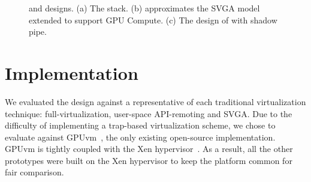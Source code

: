 \begin{figure}[!th]
\begin{subfigure}{.68\columnwidth}
		\caption{{}}
		\label{fig_trillium_direct}
	\end{subfigure}
	\caption{{\footnotesize \trxc and \Trillium designs. (a) The \Trillium stack. (b) \trxc approximates the SVGA model extended to support GPU Compute. (c) The design of \trillium with shadow pipe.}}
\end{figure}

\section{Implementation}
\label{sec_implementation}

We evaluated the \Trillium design against a representative of each traditional virtualization
technique: full-virtualization, user-space API-remoting and SVGA.
Due to the difficulty of implementing a trap-based virtualization scheme,
we chose to evaluate against GPUvm~\cite{GPUvm},
the only existing open-source implementation.
GPUvm is tightly coupled with the Xen hypervisor~\cite{barham2003xen}.
As a result, all the other prototypes were built on the Xen hypervisor
to keep the platform common for fair comparison.

